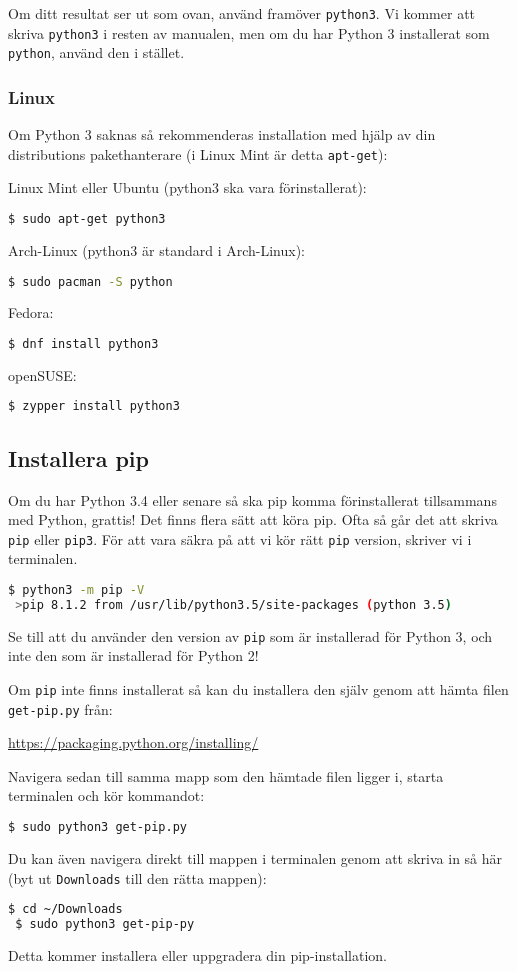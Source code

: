 \documentclass{TDP003mall}
\begin{document}
Om ditt resultat ser ut som ovan, använd framöver \verb|python3|. Vi kommer att skriva \verb|python3| i resten av manualen, men om du har Python 3 installerat som \verb|python|, använd den i stället.
\subsubsection{Linux}
Om Python 3 saknas så rekommenderas installation med hjälp av din distributions pakethanterare (i Linux Mint är detta \verb|apt-get|):



Linux Mint eller Ubuntu (python3 ska vara förinstallerat):
\begin{lstlisting}[language=bash]
$ sudo apt-get python3
\end{lstlisting}
Arch-Linux (python3 är standard i Arch-Linux):
\begin{lstlisting}[language=bash]
$ sudo pacman -S python 
\end{lstlisting}
Fedora:
\begin{lstlisting}[language=bash]
$ dnf install python3
\end{lstlisting}
openSUSE:
\begin{lstlisting}[language=bash]
$ zypper install python3
\end{lstlisting}

\subsection{Installera pip}
Om du har Python 3.4 eller senare så ska pip komma förinstallerat tillsammans med Python, grattis!
Det finns flera sätt att köra pip. Ofta så går det att skriva \verb|pip| eller \verb|pip3|. För att vara säkra på att vi kör rätt \verb|pip| version, skriver vi i terminalen.

\begin{lstlisting}[language=bash]
 $ python3 -m pip -V
 >pip 8.1.2 from /usr/lib/python3.5/site-packages (python 3.5)
\end{lstlisting}
Se till att du använder den version av \verb|pip| som är installerad för Python 3, och inte den som är installerad för Python 2!

Om \verb|pip| inte finns installerat så kan du installera den själv genom att hämta filen \verb|get-pip.py| från:

\url{https://packaging.python.org/installing/}

Navigera sedan till samma mapp som den hämtade filen ligger i, starta terminalen och kör kommandot:
\begin{lstlisting}[language=bash]
 $ sudo python3 get-pip.py
\end{lstlisting}
Du kan även navigera direkt till mappen i terminalen genom att skriva in så här (byt ut \verb|Downloads| till den rätta mappen):
\begin{lstlisting}[language=bash]
 $ cd ~/Downloads
 $ sudo python3 get-pip-py
\end{lstlisting}
Detta kommer installera eller uppgradera din pip-installation. 
\end{document}
